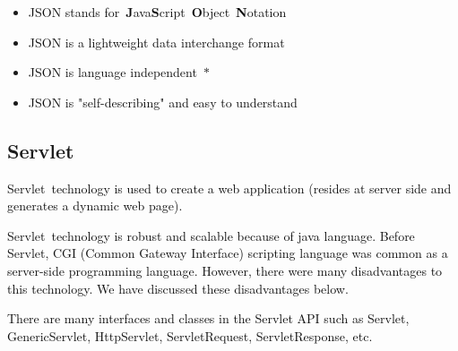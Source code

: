 \documentclass[12pt]{report}
\renewcommand{\_}{\kern-1.5pt\textunderscore\kern-1.5pt}
\begin{document}
\setlength{\parskip}{5.04pt}
\begin{itemize}
	\item \textcolor[HTML]{0D0D0D}{JSON stands for \textbf{J}ava\textbf{S}cript \textbf{O}bject \textbf{N}otation}\par

	\item \textcolor[HTML]{0D0D0D}{JSON is a lightweight data interchange format}\par

	\item \textcolor[HTML]{0D0D0D}{JSON is language independent \textbf{$\ast$ }}\par

	\item \textcolor[HTML]{0D0D0D}{JSON is "self-describing" and easy to understand}
\end{itemize}\par


\vspace{\baselineskip}
\begin{adjustwidth}{0.3in}{0.84in}
\subsection*{Servlet}
\end{adjustwidth}

\begin{adjustwidth}{0.3in}{0.84in}
\textcolor[HTML]{0D0D0D}{Servlet technology is used to create a web application (resides at server side and generates a dynamic web page).}\par

\end{adjustwidth}

\begin{adjustwidth}{0.3in}{0.84in}
\textcolor[HTML]{0D0D0D}{Servlet technology is robust and scalable because of java language. Before Servlet, CGI (Common Gateway Interface) scripting language was common as a server-side programming language. However, there were many disadvantages to this technology. We have discussed these disadvantages below.}\par

\end{adjustwidth}

\begin{adjustwidth}{0.3in}{0.84in}
\textcolor[HTML]{0D0D0D}{There are many interfaces and classes in the Servlet API such as Servlet, GenericServlet, HttpServlet, ServletRequest, ServletResponse, etc.}\par

\end{adjustwidth}
\end{document}
